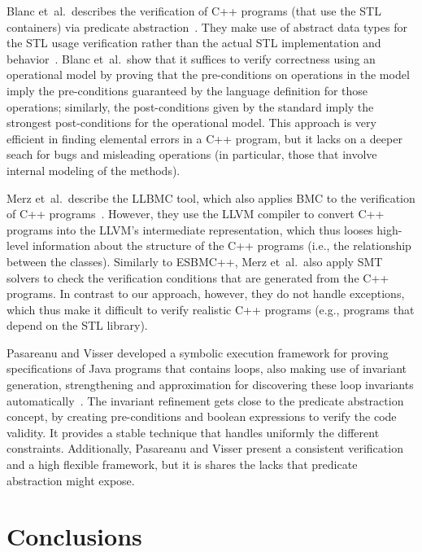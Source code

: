 \documentclass[a4paper]{llncs}
\begin{document}
Blanc et~al.\ describes the verification of C++ programs (that use the STL containers)
via predicate abstraction~\cite{Blanc07}. They make use of abstract data types for the STL
usage verification rather than the actual STL implementation and behavior~\cite{Blanc07}.
Blanc et~al.\ show that it suffices to verify correctness using an operational model
by proving that the pre-conditions on operations in the model imply the pre-conditions
guaranteed by the language definition for those operations; similarly, the post-conditions
given by the standard imply the strongest post-conditions for the operational model.
This approach is very efficient in finding elemental errors in a C++ program, but it lacks
on a deeper seach for bugs and misleading operations (in particular, those that involve internal
modeling of the methods).

Merz et~al.\ describe the LLBMC tool, which also applies BMC to the verification
of C++ programs~\cite{Florian12}. However, they use the LLVM compiler to convert C++
programs into the LLVM's intermediate representation, which thus looses high-level
information about the structure of the C++ programs (i.e., the relationship between
the classes). Similarly to ESBMC++, Merz et~al.\ also apply SMT solvers to check the verification
conditions that are generated from the C++ programs. In contrast to our approach, however,
they do not handle exceptions, which thus make it difficult to verify realistic C++ programs
(e.g., programs that depend on the STL library).

Pasareanu and Visser developed a symbolic execution framework
for proving specifications of Java programs that contains loops,
also making use of invariant generation, strengthening and approximation
for discovering these loop invariants automatically~\cite{Pasareanu04}.
The invariant refinement gets close to the predicate abstraction concept,
by creating pre-conditions and boolean expressions to verify the code validity.
It provides a stable technique that handles uniformly the different constraints.
Additionally, Pasareanu and Visser present a consistent verification and a high
flexible framework, but it is shares the lacks that predicate abstraction might
expose.

\section{Conclusions}
\end{document}
